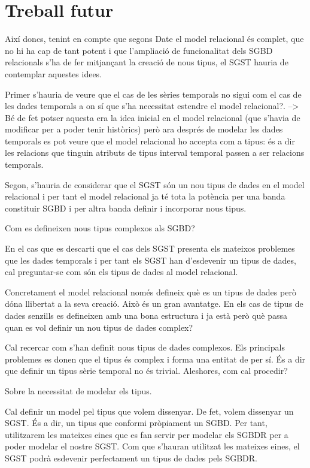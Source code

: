 \section{Treball futur}




Així doncs, tenint en compte que segons Date el model relacional és complet, que no hi ha cap de tant potent i que l'ampliació de funcionalitat dels SGBD relacionals s'ha de fer mitjançant la creació de nous tipus, el SGST hauria de contemplar aquestes idees. 

Primer s'hauria de veure que el cas de les sèries temporals no sigui com el cas de les dades temporals a on sí que s'ha necessitat estendre el model relacional?. --> Bé de fet potser aquesta era la idea inicial en el model relacional (que s'havia de modificar per a poder tenir històrics) però ara després de modelar les dades temporals es pot veure que el model relacional ho accepta com a tipus: és a dir les relacions que tinguin atributs de tipus interval temporal passen a ser relacions temporals.

Segon, s'hauria de considerar que el SGST són un nou tipus de dades en el model relacional i per tant el model relacional ja té tota la potència per una banda constituir SGBD i per altra banda definir i incorporar nous tipus.


Com es defineixen nous tipus complexos als SGBD?

En el cas que es descarti que el cas dels SGST presenta els mateixos problemes que les dades temporals i per tant els SGST han d'esdevenir un tipus de dades, cal preguntar-se com són els tipus de dades al model relacional.

Concretament el model relacional només defineix què es un tipus de dades però dóna llibertat a la seva creació. Això és un gran avantatge. En els cas de tipus de dades senzills es defineixen amb una bona estructura i ja està però què passa quan es vol definir un nou tipus de dades complex?

Cal recercar com s'han definit nous tipus de dades complexos. Els principals problemes es donen que el tipus és complex i forma una entitat de per sí. És a dir que definir un tipus sèrie temporal no és trivial. Aleshores, com cal procedir?



Sobre la necessitat de modelar els tipus.

Cal definir un model pel tipus que volem dissenyar.
De fet, volem dissenyar un SGST. És a dir, un tipus que conformi pròpiament un SGBD. Per tant, utilitzarem les mateixes eines que es fan servir per modelar els SGBDR per a poder modelar el nostre SGST. Com que s'hauran utilitzat les mateixes eines, el SGST podrà esdevenir perfectament un tipus de dades pels SGBDR.

